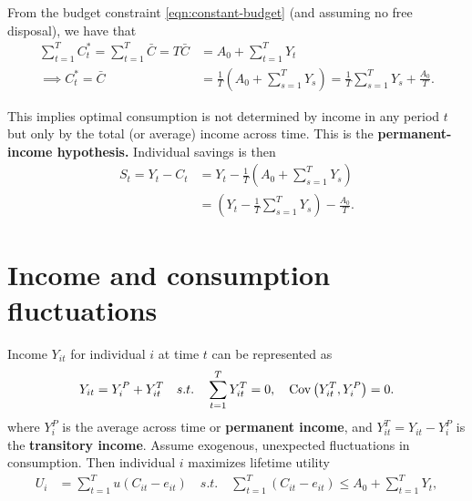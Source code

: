 \documentclass[../main.tex]{subfiles}
\begin{document}
        
        From the budget constraint \eqref{eqn:constant-budget} (and assuming no free disposal), we have that
        \begin{align}
            \sum_{t=1}^T C_t^*
            = \sum_{t=1}^T \bar{C}
            = T \bar{C}
            &= A_0 + \sum_{t=1}^T Y_t
            \\
            \implies
            C_t^*
            =\bar{C}
            &= \frac{1}{T} \left( A_0 + \sum_{s=1}^T Y_s \right)
            = \frac{1}{T}\sum_{s=1}^T Y_s +  \frac{A_0}{T}.
        \end{align}
        
        This implies optimal consumption is not determined by income in any period $t$ but only by the total (or average) income across time. This is the \textbf{permanent-income hypothesis.} Individual savings is then
        \begin{align}
            S_t 
            = Y_t - C_t
            &= Y_t - \frac{1}{T} \left( A_0 + \sum_{s=1}^T Y_s \right)
            \\
            &= \left(Y_t -  \frac{1}{T}\sum_{s=1}^T Y_s \right) - \frac{A_0}{T}.
        \end{align}
    
    \section{Income and consumption fluctuations}
        
        Income $Y_{it}$ for individual $i$ at time $t$ can be represented as
        \begin{align}
            Y_{it} = Y_{i}^P + Y_{it}^T
            \quad s.t. \quad
            \sum_{t=1}^T Y_{it}^T = 0,\quad
            \mathrm{Cov}\left(Y_{it}^T, Y_{i}^P\right) = 0.
            \label{eqn:income-fluctuation}
        \end{align}
        where $Y_{i}^P$ is the average across time or \textbf{permanent income}, and $Y_{it}^T = Y_{it} - Y_{i}^P$ is the \textbf{transitory income}. Assume exogenous, unexpected fluctuations in consumption. Then individual $i$ maximizes lifetime utility
        \begin{align}
            U_i &= \sum_{t=1}^T u\left(C_{it} - e_{it}\right)
             \quad s.t. \quad
            \sum_{t=1}^T \left(C_{it} - e_{it}\right) \le A_0 + \sum_{t=1}^T Y_t,
            \label{eqn:utility-fluctuation}
        \end{align}
        
\end{document}
